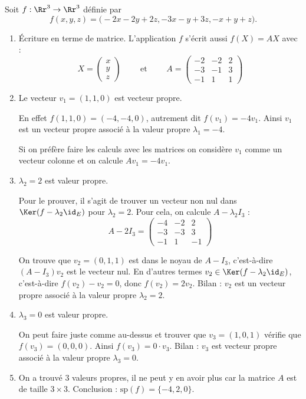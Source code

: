 \documentclass[12pt, class=report,crop=false]{standalone}
\newcommand{\Sp}{\text{sp}}
\begin{document}
\begin{exemple}
\label{ex:diagon1}
Soit $f : \Rr^3 \to \Rr^3$ définie par 
$$f(x,y,z) = \big(
-2x-2y+ 2z, 
-3x-y+3z,
-x+y+z\big).$$

\begin{enumerate}
  \item \'Ecriture en terme de matrice. L'application $f$ s'écrit aussi
  $f(X)=AX$ avec :
$$
X = \begin{pmatrix}
x\\y\\z
\end{pmatrix}
\qquad \text { et } \qquad 
A = \begin{pmatrix}
-2 & -2 & 2 \\
-3 & -1 & 3 \\
-1 & 1 & 1
\end{pmatrix}$$
  
  
  \item Le vecteur $v_1 = (1,1,0)$ est vecteur propre.
  
  En effet $f(1,1,0) = (-4,-4,0)$, autrement dit $f(v_1) = -4 v_1$. Ainsi $v_1$ est un vecteur propre associé à la valeur propre $\lambda_1 = -4$.
  
  Si on préfère faire les calculs avec les matrices on considère $v_1$ comme un vecteur colonne et on calcule $Av_1 = -4v_1$.
  
  \item $\lambda_2 = 2$ est valeur propre.
  
  Pour le prouver, il s'agit de trouver un vecteur non nul dans $\Ker(f-\lambda_2 \id_E)$ pour $\lambda_2=2$.
  Pour cela, on calcule $A - \lambda_2 I_3$ :
  $$A-2I_3 =\begin{pmatrix}
-4 & -2 & 2 \\
-3 & -3 & 3 \\
-1 & 1 & -1
\end{pmatrix}$$
  
  On trouve que $v_2 = (0,1,1)$ est dans le noyau de $A-I_3$, c'est-à-dire
  $(A-I_3)v_2$ est le vecteur nul. En d'autres termes $v_2 \in \Ker(f-\lambda_2 \id_E)$,
  c'est-à-dire $f(v_2) - v_2 = 0$, donc $f(v_2) = 2v_2$. Bilan : $v_2$ est un vecteur propre associé à la valeur propre $\lambda_2 = 2$.
  
  \item $\lambda_3 = 0$ est valeur propre.
  
  On peut faire juste comme au-dessus et trouver que $v_3 = (1,0,1)$ vérifie que $f(v_3)=(0,0,0)$.
  Ainsi $f(v_3) = 0 \cdot v_3$. Bilan :  $v_3$ est vecteur propre associé à la valeur propre $\lambda_3 = 0$.
  
  \item On a trouvé $3$ valeurs propres, il ne peut y en avoir plus car la matrice $A$ est de taille $3\times 3$. Conclusion : $\Sp(f) = \{-4,2,0\}$.

\end{enumerate}
\end{exemple}
\end{document}
